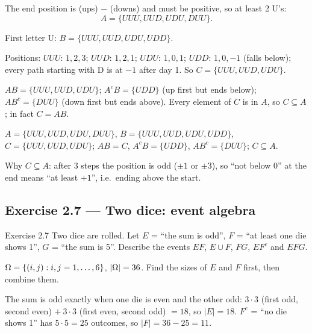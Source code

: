 	 The end position is (ups) $-$ (downs) and must be positive, so
	at least 2 U's:
	\[ A=\{UUU,UUD,UDU,DUU\}. \]

	 First letter U: $B=\{UUU,UUD,UDU,UDD\}$.

	 Positions: $UUU$: $1,2,3$; $UUD$: $1,2,1$; $UDU$: $1,0,1$;
	$UDD$: $1,0,-1$ (falls below); every path starting with D is at $-1$ after
	day 1. So $C=\{UUU,UUD,UDU\}$.

	 $AB=\{UUU,UUD,UDU\}$; $A^cB=\{UDD\}$ (up first but
	ends below); $AB^c=\{DUU\}$ (down first but ends above). Every element of
	$C$ is in $A$, so $C\subseteq A$; in fact $C=AB$.
	\begin{answer}
		$A=\{UUU,UUD,UDU,DUU\}$, $B=\{UUU,UUD,UDU,UDD\}$, $C=\{UUU,UUD,UDU\}$;
		$AB=C$, $A^cB=\{UDD\}$, $AB^c=\{DUU\}$; $C\subseteq A$.
	\end{answer}
	\begin{remark}
		Why $C\subseteq A$: after 3 steps the position is odd ($\pm1$ or $\pm3$),
		so ``not below 0'' at the end means ``at least $+1$'', i.e.\ ending above
		the start.
	\end{remark}
\fi

\subsection{Exercise 2.7 --- Two dice: event algebra}

\begin{task}{Exercise 2.7}
	Two dice are rolled. Let $E$ = ``the sum is odd'', $F$ = ``at least one die
	shows 1'', $G$ = ``the sum is 5''. Describe the events $EF$, $E\cup F$,
	$FG$, $EF^c$ and $EFG$.
\end{task}
\workspace{3.5cm}

\ifsolutions
	\soltitle
	\idea $\Omega=\{(i,j):i,j=1,\dots,6\}$, $|\Omega|=36$. Find the sizes of $E$ and
	$F$ first, then combine them.

	 The sum is odd exactly when one die is even and the
	other odd: $3\cdot3$ (first odd, second even) $+\ 3\cdot3$ (first even,
	second odd) $=18$, so $|E|=18$. $F^c$ = ``no die shows 1'' has $5\cdot5=25$
	outcomes, so $|F|=36-25=11$.

